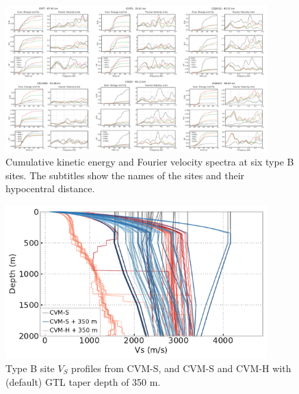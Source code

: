 \clearpage
\begin{figure}[!ht]
  \centering
  \includegraphics[width=0.9\textwidth]{figures/figure_vs30_12.pdf}
  \caption{Cumulative kinetic energy and Fourier velocity spectra at six type B sites. The subtitles show the names of the sites and their hypocentral distance.
  }
  \label{fig:vs30-12}
\end{figure}

\clearpage
\begin{figure}[!ht]
  \centering
  \includegraphics[width=0.9\textwidth]{figures/figure_vs30_13.pdf}
  \caption{Type B site $V_S$ profiles from CVM-S, and CVM-S and CVM-H with (default) \citet{elyVs30derivedNearsurfaceSeismic2010} GTL taper depth of 350 m.}
  \label{fig:vs30-13}
\end{figure}

